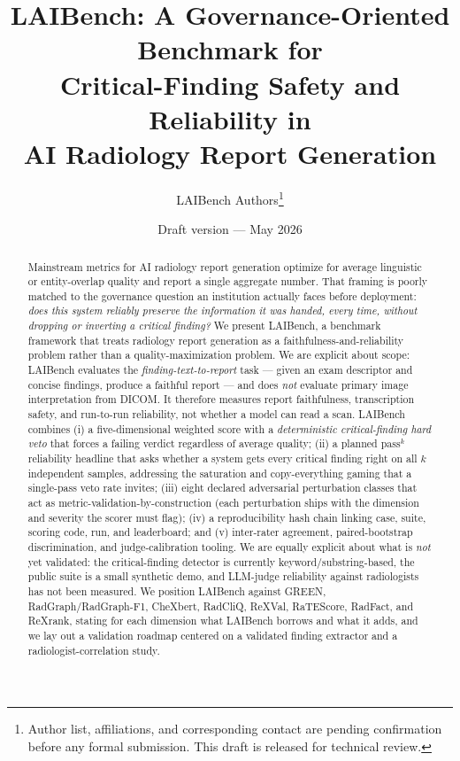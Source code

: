 \documentclass[11pt]{article}
\title{LAIBench: A Governance-Oriented Benchmark for\\
Critical-Finding Safety and Reliability in\\
AI Radiology Report Generation}
\author{LAIBench Authors\thanks{Author list, affiliations, and corresponding
contact are pending confirmation before any formal submission. This draft is
released for technical review.}}
\date{Draft version --- May 2026}
\newcommand{\passk}{$\mathrm{pass}^{k}$}
\begin{document}
\maketitle

\begin{abstract}
Mainstream metrics for AI radiology report generation optimize for average
linguistic or entity-overlap quality and report a single aggregate number. That
framing is poorly matched to the governance question an institution actually
faces before deployment: \emph{does this system reliably preserve the
information it was handed, every time, without dropping or inverting a critical
finding?} We present LAIBench, a benchmark framework that treats radiology
report generation as a faithfulness-and-reliability problem rather than a
quality-maximization problem. We are explicit about scope: LAIBench evaluates
the \emph{finding-text-to-report} task --- given an exam descriptor and concise
findings, produce a faithful report --- and does \emph{not} evaluate primary
image interpretation from DICOM. It therefore measures report faithfulness,
transcription safety, and run-to-run reliability, not whether a model can read a
scan. LAIBench combines (i) a five-dimensional weighted score with a
\emph{deterministic critical-finding hard veto} that forces a failing verdict
regardless of average quality; (ii) a planned \passk{} reliability headline that
asks whether a system gets every critical finding right on all $k$ independent
samples, addressing the saturation and copy-everything gaming that a single-pass
veto rate invites; (iii) eight declared adversarial perturbation classes that
act as metric-validation-by-construction (each perturbation ships with the
dimension and severity the scorer must flag); (iv) a reproducibility hash chain
linking case, suite, scoring code, run, and leaderboard; and (v) inter-rater
agreement, paired-bootstrap discrimination, and judge-calibration tooling. We
are equally explicit about what is \emph{not} yet validated: the critical-finding
detector is currently keyword/substring-based, the public suite is a small
synthetic demo, and LLM-judge reliability against radiologists has not been
measured. We position LAIBench against GREEN, RadGraph/RadGraph-F1, CheXbert,
RadCliQ, ReXVal, RaTEScore, RadFact, and ReXrank, stating for each dimension what
LAIBench borrows and what it adds, and we lay out a validation roadmap centered
on a validated finding extractor and a radiologist-correlation study.
\end{abstract}
\end{document}
